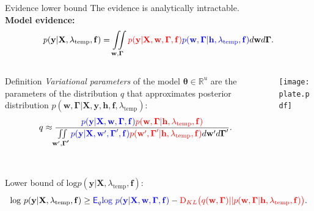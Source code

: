 \documentclass[usenames,dvipsnames,11pt,pdf,utf8,russian,aspectratio=43]{beamer}
\begin{document}
\begin{frame}{Evidence lower bound} 
\footnotesize
The evidence is analytically intractable.\\
\textbf{Model evidence:}
\[
p(\mathbf{y}|\mathbf{X}, \lambda_\text{temp},\mathbf{f}) =
 \iint\limits_{\mathbf{w}, \boldsymbol{\Gamma}}  \textcolor{red}{p(\mathbf{y}|\mathbf{X},\mathbf{w},  \boldsymbol{\Gamma}, \mathbf{f})} \textcolor{blue}{p(\mathbf{w}, \boldsymbol{\Gamma}|\mathbf{h}, \lambda_\text{temp},\mathbf{f})}d\mathbf{w}d{\boldsymbol{\Gamma}}.                         
\]

\begin{columns}
\begin{column}{0.55\textwidth}
  
\begin{block}{Definition}
\textit{Variational parameters} of the model $\boldsymbol{\theta} \in \mathbb{R}^{{u}}$ are the parameters of the distribution $q$ that approximates posterior distribution $p(\mathbf{w}, \boldsymbol{\Gamma}|\mathbf{X}, \mathbf{y}, \mathbf{h}, \mathbf{f}, \lambda_\text{temp})$:
\[
    q \approx  \frac{\textcolor{blue}{p(\mathbf{y}|\mathbf{X},\mathbf{w},\boldsymbol{\Gamma}, \mathbf{f})}\textcolor{red}{p(\mathbf{w}, \boldsymbol{\Gamma}|\mathbf{h}, \lambda_\text{temp},\mathbf{f})}}{\iint\limits_{\mathbf{w}', \boldsymbol{\Gamma'}}\textcolor{blue}{p(\mathbf{y}|\mathbf{X},\mathbf{w}',\boldsymbol{\Gamma}',\mathbf{f})}\textcolor{red}{p(\mathbf{w}', \boldsymbol{\Gamma}'|\mathbf{h}, \lambda_\text{temp},\mathbf{f})}d\mathbf{w}'d\boldsymbol{\Gamma}'}.
\]
\end{block} 

\end{column}
\begin{column}{0.45\textwidth}  %
    \begin{center}
     \texttt{[image: plate.pdf]}
     \end{center}
\end{column}
\end{columns}



~\\Lower bound of $\text{log}\hat{{p}}(\mathbf{y}|\mathbf{X}, \lambda_\text{temp},\mathbf{f})$:
$$                                                                                                                                              
        \text{log}~p(\mathbf{y}|\mathbf{X}, \lambda_\text{temp},\mathbf{f}) \geq 
\textcolor{blue}{\mathsf{E}_q \text{log}~{p(\mathbf{y} | \mathbf{X}, \mathbf{w}, \boldsymbol{\Gamma},\mathbf{f})}} - \textcolor{red}{\text{D}_{KL}\bigl(q(\mathbf{w}, \boldsymbol{\Gamma})||p(\mathbf{w}, \boldsymbol{\Gamma}| \mathbf{h}, \lambda_\text{temp},\mathbf{f})\bigr)}.
$$ 




\end{frame}
\end{document}
